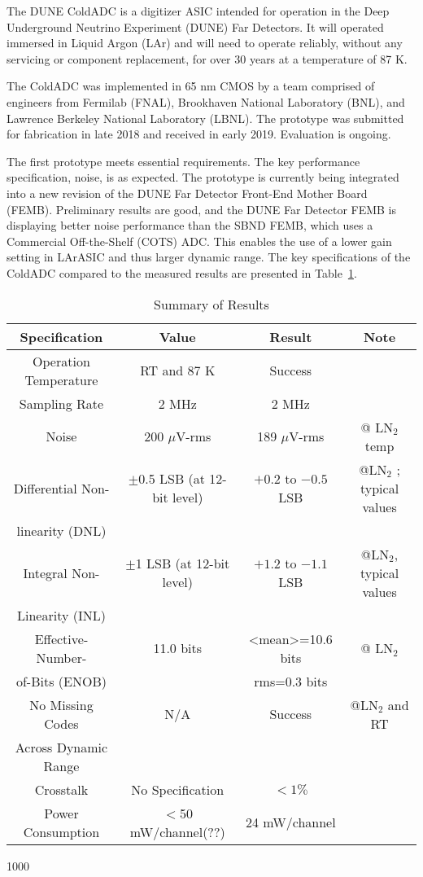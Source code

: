 \label{sec:1}

The DUNE ColdADC is a digitizer ASIC intended for operation in the Deep Underground Neutrino Experiment (DUNE) Far Detectors. It will operated immersed in Liquid Argon (LAr) and will need to operate reliably, without any servicing or component replacement, for over 30 years at a temperature of 87 K.

The ColdADC was implemented in 65 nm CMOS by a team comprised of engineers from Fermilab (FNAL), Brookhaven National Laboratory (BNL), and Lawrence Berkeley National Laboratory (LBNL). The prototype was submitted for fabrication in late 2018 and received in early 2019. Evaluation is ongoing. 

The first prototype meets essential requirements. The key performance specification, noise, is as expected. The prototype is currently being integrated into a new revision of the DUNE Far Detector Front-End Mother Board (FEMB). Preliminary results are good, and the DUNE Far Detector FEMB is displaying better noise performance than the SBND FEMB, which uses a Commercial Off-the-Shelf (COTS) ADC. This enables the use of a lower gain setting in LArASIC and thus larger dynamic range. The key specifications of the ColdADC compared to the measured results are presented in Table~\ref{tab:coldadc_specs}.
\begin{table}[h]
\centering
\begin{tabular}{|c|c|c|c|}
\hline
\textbf{ Specification } & \textbf{Value} & \textbf{Result} & \textbf{Note}  \\ \hline \hline
Operation Temperature &  RT and 87 K & Success & \\ \hline
Sampling Rate & 2 MHz & 2 MHz & \\ \hline
Noise & 200 $\mu$V-rms & 189 $\mu$V-rms & @ LN$_2$ temp \\ \hline
Differential Non- & $\pm$0.5 LSB (at 12-bit level) & $+0.2$ to $-0.5$ LSB & @LN$_2$ ; typical values \\
linearity (DNL) & & &  \\ \hline
Integral Non- & $\pm$1 LSB (at 12-bit level) & $+1.2$ to $-1.1$ LSB & @LN$_2$, typical values \\
Linearity (INL) & & &  \\ \hline
Effective-Number- & 11.0 bits & <mean>=10.6 bits & @ LN$_2$ \\ 
of-Bits (ENOB) & & rms=0.3 bits & \\ \hline
No Missing Codes & N/A & Success & @LN$_2$ and RT \\ 
Across Dynamic Range & & & \\ \hline
Crosstalk  & No Specification & $<1\%$ & \\ \hline
Power Consumption & $<$50 mW/channel(??) & 24 mW/channel &  \\ \hline
\end{tabular}
\caption{Summary of Results}
\label{tab:coldadc_specs}
\end{table}     1000


